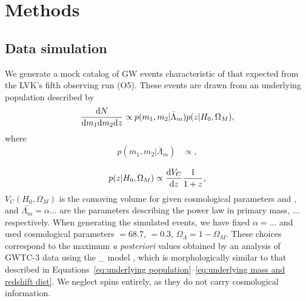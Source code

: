\documentclass[]{aastex631}
\begin{document}

\section{Methods}
\label{sec:methods}
\subsection{Data simulation}
We generate a mock catalog of GW events characteristic of that expected from the LVK's fifth observing run (O5). 
These events are drawn from an underlying population described by
\begin{equation}
\label{eq:underlying population}
    \frac{\diff N}{\diff m_1 \diff m_2 \diff z} \propto p(m_1, m_2|\bar{\Lambda}_m) p(z|H_0, \Omega_M),
\end{equation}
where 
\begin{align}
    p(m_1,m_2|\bar{\Lambda}_m) &\propto ,\\
\label{eq:underlying mass dist}
\end{align}
\begin{equation}
    p(z|H_0, \Omega_M) \propto \frac{\diff V_C}{\diff z} \frac{1}{1+z},
    \label{eq:underlying redshift dist}
\end{equation}
$V_C(H_0, \Omega_M)$ is the comoving volume for given cosmological parameters \Ho{} and \Omm{}, and $\bar{\Lambda_m} = \alpha$... are the parameters describing the power law in primary mass, ... respectively. 
When generating the simulated events, we have fixed $\alpha= $... and used cosmological parameters \Ho$=68.7$, \Omm$=0.3$, $\Omega_\Lambda=1-\Omega_M$.
These choices correspond to the maximum \emph{a posteriori} values obtained by an analysis of GWTC-3 data using the \_ model \cite{o3b_pop}, which is morphologically similar to that described in Equations~\ref{eq:underlying population}--\ref{eq:underlying mass and redshift dist}.
We neglect spins entirely, as they do not carry cosmological information.
\end{document}
